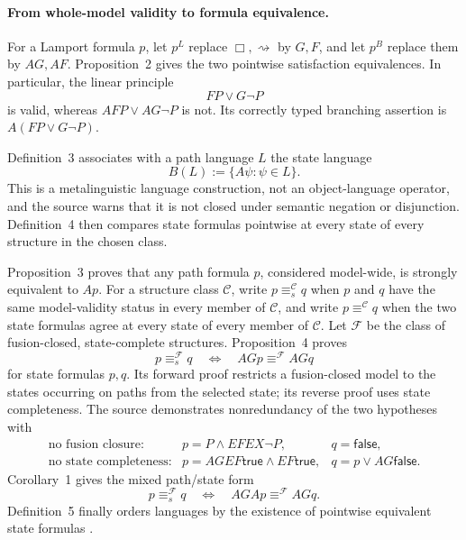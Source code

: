 \paragraph{From whole-model validity to formula equivalence.}
For a Lamport formula \(p\), let \(p^L\) replace
\(\Box,\rightsquigarrow\) by \(G,F\), and let \(p^B\) replace them by
\(AG,AF\).  Proposition~2 gives the two pointwise satisfaction
equivalences.  In particular, the linear principle
\[
 FP\lor G\neg P
\]
is valid, whereas \(AFP\lor AG\neg P\) is not.  Its correctly typed
branching assertion is \(A(FP\lor G\neg P)\).

Definition~3 associates with a path language \(L\) the state language
\[
 B(L):=\{A\psi:\psi\in L\}.
\]
This is a metalinguistic language construction, not an object-language
operator, and the source warns that it is not closed under semantic negation
or disjunction.  Definition~4 then compares state formulas pointwise at
every state of every structure in the chosen class.

Proposition~3 proves that any path formula \(p\), considered model-wide, is
strongly equivalent to \(Ap\).  For a structure class \(\mathcal C\), write
\(p\equiv_s^{\mathcal C}q\) when \(p\) and \(q\) have the same model-validity
status in every member of \(\mathcal C\), and write
\(p\equiv^{\mathcal C}q\) when the two state formulas agree at every state of
every member of \(\mathcal C\).  Let \(\mathcal F\) be the class of
fusion-closed, state-complete structures.  Proposition~4 proves
\[
 p\equiv_s^{\mathcal F}q
 \quad\Longleftrightarrow\quad
 AGp\equiv^{\mathcal F}AGq
\]
for state formulas \(p,q\).  Its forward proof restricts a fusion-closed
model to the states occurring on paths from the selected state; its reverse
proof uses state completeness.  The source demonstrates nonredundancy of
the two hypotheses with
\[
\begin{array}{lll}
\text{no fusion closure:}
 &p=P\land EFEX\neg P,&q=\mathsf{false},\\
\text{no state completeness:}
 &p=AGEF\mathsf{true}\land EF\mathsf{true},&
 q=p\lor AG\mathsf{false}.
\end{array}
\]
Corollary~1 gives the mixed path/state form
\[
 p\equiv_s^{\mathcal F}q
 \quad\Longleftrightarrow\quad
 AGAp\equiv^{\mathcal F}AGq.
\]
Definition~5 finally orders languages by the existence of pointwise
equivalent state formulas \cite[pp.~158--160]{EmersonHalpern1986}.


